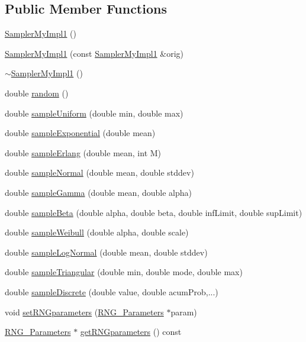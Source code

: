 \subsection*{Public Member Functions}
\begin{DoxyCompactItemize}
\item 
\hyperlink{class_sampler_my_impl1_a340d6001ebd51e2b6465e3a33471f17f}{Sampler\-My\-Impl1} ()
\item 
\hyperlink{class_sampler_my_impl1_a51879515ec245c844ae354dabd60aa3f}{Sampler\-My\-Impl1} (const \hyperlink{class_sampler_my_impl1}{Sampler\-My\-Impl1} \&orig)
\item 
\hyperlink{class_sampler_my_impl1_a40eae27af7e36a153d28f1259065f114}{$\sim$\-Sampler\-My\-Impl1} ()
\item 
double \hyperlink{class_sampler_my_impl1_a41e356a35042c5ecd982081d867c6d29}{random} ()
\item 
double \hyperlink{class_sampler_my_impl1_a49871c3b67c7dbf262fbe23b7a0e8719}{sample\-Uniform} (double min, double max)
\item 
double \hyperlink{class_sampler_my_impl1_a5ca6b9ca11b938d27521ae066b825af2}{sample\-Exponential} (double mean)
\item 
double \hyperlink{class_sampler_my_impl1_a6b2b8cc459b89d37c6c9793374875e04}{sample\-Erlang} (double mean, int M)
\item 
double \hyperlink{class_sampler_my_impl1_a0c925e9a73dfbab332d95a92f5a08fc2}{sample\-Normal} (double mean, double stddev)
\item 
double \hyperlink{class_sampler_my_impl1_a67a7d791f7e738d49843fd8df97130f5}{sample\-Gamma} (double mean, double alpha)
\item 
double \hyperlink{class_sampler_my_impl1_ad47d2778be3363f99508a7cfa6669de1}{sample\-Beta} (double alpha, double beta, double inf\-Limit, double sup\-Limit)
\item 
double \hyperlink{class_sampler_my_impl1_a6027d811554b7f90740b549778ed66e2}{sample\-Weibull} (double alpha, double scale)
\item 
double \hyperlink{class_sampler_my_impl1_a7f7e069b65ffaafb2d1196ccbc23ec8a}{sample\-Log\-Normal} (double mean, double stddev)
\item 
double \hyperlink{class_sampler_my_impl1_a370bcf50d6f899ded0214d782df4c37f}{sample\-Triangular} (double min, double mode, double max)
\item 
double \hyperlink{class_sampler_my_impl1_ad7afa6ea23e55b07fc600b4d992dd3ac}{sample\-Discrete} (double value, double acum\-Prob,...)
\item 
void \hyperlink{class_sampler_my_impl1_a7a1cad991badceb2f2445bc28064355a}{set\-R\-N\-Gparameters} (\hyperlink{class_sampler__if_1_1_r_n_g___parameters}{R\-N\-G\-\_\-\-Parameters} $\ast$param)
\item 
\hyperlink{class_sampler__if_1_1_r_n_g___parameters}{R\-N\-G\-\_\-\-Parameters} $\ast$ \hyperlink{class_sampler_my_impl1_aca9bb2c81e9e7aa64f16ce0219da3265}{get\-R\-N\-Gparameters} () const 
\end{DoxyCompactItemize}


